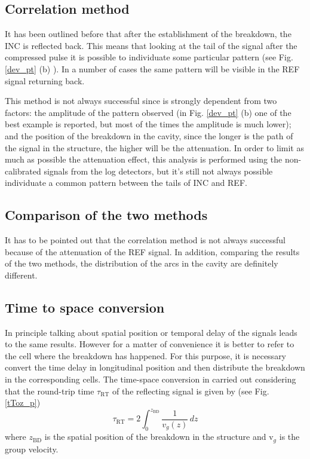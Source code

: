 \subsection[Correlation method]{Correlation method}

It has been outlined before that after the establishment of the breakdown, the INC is reflected back. This means that looking at the tail of the signal after the compressed pulse it is possible to individuate some particular pattern (see Fig. \ref{dev_pt} (b) ). In a number of cases the same pattern will be visible in the REF signal returning back. 

This method is not always successful since is strongly dependent from two factors: the amplitude of the pattern observed (in Fig. \ref{dev_pt} (b) one of the best example is reported, but most of the times the amplitude is much lower); and the position of the breakdown in the cavity, since the longer is the path of the signal in the structure, the higher will be the attenuation. In order to limit as much as possible the attenuation effect, this analysis is performed using the non-calibrated signals from the log detectors, but it's still not always possible individuate a common pattern between the tails of INC and REF.


\subsection[Comparison of the two methods]{Comparison of the two methods}

It has to be pointed out that the correlation method is not always successful because of the attenuation of the REF signal. In addition, comparing the results of the two methods, the distribution of the arcs in the cavity are definitely different. 







\subsection[Time to space conversion]{Time to space conversion}

In principle talking about spatial position or temporal delay of the signals leads to the same results. However for a matter of convenience it is better to refer to the cell where the breakdown has happened. For this purpose, it is necessary convert the time delay in longitudinal position and then distribute the breakdown in the corresponding cells. The time-space conversion in carried out considering that the round-trip time $\tau_{\text{RT}}$  of the reflecting signal is given by (see Fig. \ref{tToz_p})
\begin{equation}
\tau_{\text{RT}} = 2 \int_0^{z_{\text{BD}}} \frac{1}{v_g (z)} \, dz
\label{tRT}
\end{equation}
where $z_{\text{BD}}$ is the spatial position of the breakdown in the structure and v$_g$ is the group velocity.

